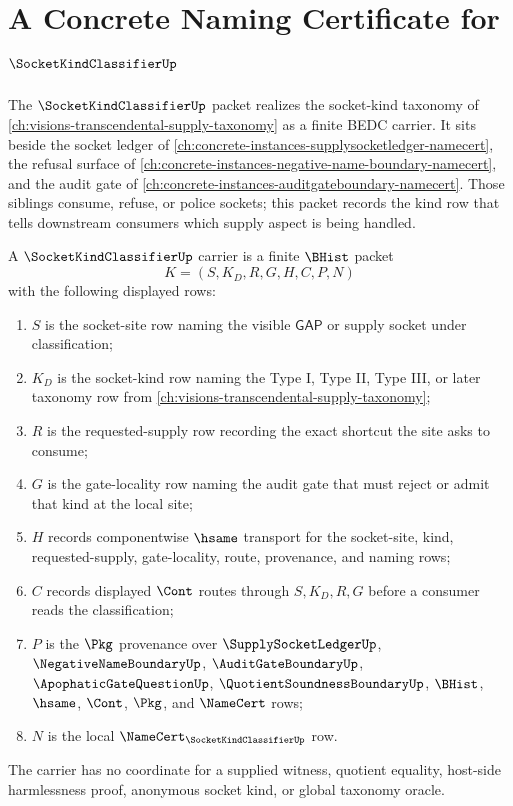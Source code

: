 \chapter{A Concrete Naming Certificate for $\SocketKindClassifierUp$}
\label{ch:concrete-instances-socketkindclassifier-namecert}

The $\SocketKindClassifierUp$ packet realizes the socket-kind taxonomy of \autoref{ch:visions-transcendental-supply-taxonomy} as a finite BEDC carrier. It sits beside the socket ledger of \autoref{ch:concrete-instances-supplysocketledger-namecert}, the refusal surface of \autoref{ch:concrete-instances-negative-name-boundary-namecert}, and the audit gate of \autoref{ch:concrete-instances-auditgateboundary-namecert}. Those siblings consume, refuse, or police sockets; this packet records the kind row that tells downstream consumers which supply aspect is being handled.

\begin{definition}
\label{def:socket-kind-classifier-carrier}
A $\SocketKindClassifierUp$ carrier is a finite $\BHist$ packet
$$
K=(S,K_D,R,G,H,C,P,N)
$$
with the following displayed rows:
\begin{enumerate}
\item $S$ is the socket-site row naming the visible $\mathsf{GAP}$ or supply socket under classification;
\item $K_D$ is the socket-kind row naming the Type I, Type II, Type III, or later taxonomy row from \autoref{ch:visions-transcendental-supply-taxonomy};
\item $R$ is the requested-supply row recording the exact shortcut the site asks to consume;
\item $G$ is the gate-locality row naming the audit gate that must reject or admit that kind at the local site;
\item $H$ records componentwise $\hsame$ transport for the socket-site, kind, requested-supply, gate-locality, route, provenance, and naming rows;
\item $C$ records displayed $\Cont$ routes through $S,K_D,R,G$ before a consumer reads the classification;
\item $P$ is the $\Pkg$ provenance over $\SupplySocketLedgerUp$, $\NegativeNameBoundaryUp$, $\AuditGateBoundaryUp$, $\ApophaticGateQuestionUp$, $\QuotientSoundnessBoundaryUp$, $\BHist$, $\hsame$, $\Cont$, $\Pkg$, and $\NameCert$ rows;
\item $N$ is the local $\NameCert_{\SocketKindClassifierUp}$ row.
\end{enumerate}
The carrier has no coordinate for a supplied witness, quotient equality, host-side harmlessness proof, anonymous socket kind, or global taxonomy oracle.
\end{definition}

